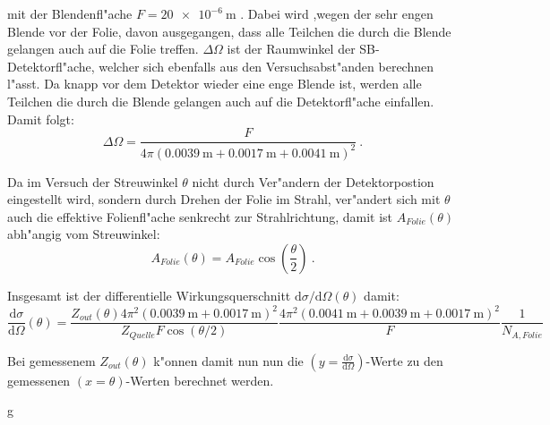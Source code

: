     mit der Blendenfl"ache $F=\SI{20e-6}{\meter}$ \cite{Anleitung}.
    Dabei wird ,wegen der sehr engen Blende vor der Folie, davon ausgegangen, dass alle Teilchen die durch die Blende gelangen auch auf die Folie treffen.
    $\Delta \Omega$ ist der Raumwinkel der SB-Detektorfl"ache, welcher sich ebenfalls aus den Versuchsabst"anden berechnen l"asst. Da knapp vor dem Detektor wieder eine enge Blende ist, werden alle Teilchen die durch die Blende gelangen auch auf die Detektorfl"ache einfallen. Damit folgt:
    \begin{equation}
      \Delta \Omega = \frac{F}{4\pi(\SI{0.0039}{\meter}+\SI{0.0017}{\meter}+\SI{0.0041}{\meter})^2} \: .
    \end{equation}

    Da im Versuch der Streuwinkel $\theta$ nicht durch Ver"andern der Detektorpostion eingestellt wird, sondern durch Drehen der Folie im Strahl, ver"andert sich mit $\theta$ auch die effektive Folienfl"ache senkrecht zur Strahlrichtung, damit ist $A_{Folie}(\theta)$ abh"angig vom Streuwinkel:
    \begin{equation}
      A_{Folie}(\theta) = A_{Folie}\cos\left(\frac{\theta}{2}\right) \:.
    \end{equation}

    Insgesamt ist der differentielle Wirkungsquerschnitt $\text{d}\sigma/\text{d}\Omega(\theta)$ damit:
    \begin{equation}
      \frac{\text{d}\sigma}{\text{d}\Omega}(\theta) =  \frac{Z_{out}(\theta)4\pi^2(\SI{0,0039}{\meter}+\SI{0,0017}{\meter})^2}{Z_{Quelle}F\cos(\theta/2)}
      \frac{4\pi^2 (\SI{0,0041}{\meter}+\SI{0,0039}{\meter}+\SI{0.0017}{\meter})^2}{F}\frac{1}{N_{A,Folie}}
      \label{querschnitt}
    \end{equation}

    Bei gemessenem $Z_{out}(\theta)$ k"onnen damit nun nun die $(y=\frac{\text{d}\sigma}{\text{d}\Omega})$-Werte zu den gemessenen $(x=\theta)$-Werten berechnet werden.


















    g
